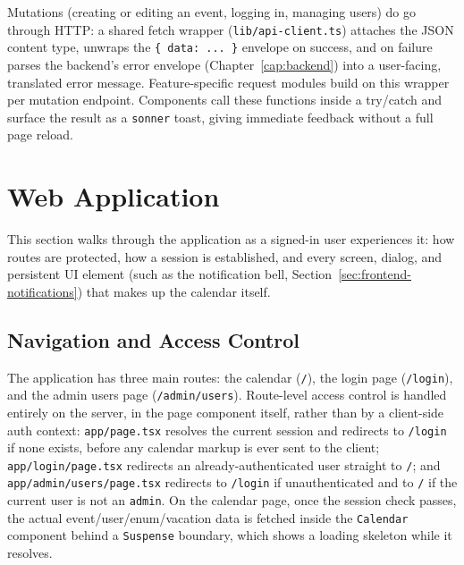 Mutations (creating or editing an event, logging in, managing users) do go through HTTP: a shared fetch wrapper (\texttt{lib/api-client.ts}) attaches the JSON content type, unwraps the \texttt{\{ data: ... \}} envelope on success, and on failure parses the backend's error envelope (Chapter~\ref{cap:backend}) into a user-facing, translated error message. Feature-specific request modules build on this wrapper per mutation endpoint. Components call these functions inside a try/catch and surface the result as a \texttt{sonner} toast, giving immediate feedback without a full page reload.

\section{Web Application} \label{sec:frontend-web-app}

This section walks through the application as a signed-in user experiences it: how routes are protected, how a session is established, and every screen, dialog, and persistent UI element (such as the notification bell, Section~\ref{sec:frontend-notifications}) that makes up the calendar itself.

\subsection{Navigation and Access Control} \label{sec:frontend-navigation}
The application has three main routes: the calendar (\texttt{/}), the login page (\texttt{/login}), and the admin users page (\texttt{/admin/users}). Route-level access control is handled entirely on the server, in the page component itself, rather than by a client-side auth context: \texttt{app/page.tsx} resolves the current session and redirects to \texttt{/login} if none exists, before any calendar markup is ever sent to the client; \texttt{app/login/page.tsx} redirects an already-authenticated user straight to \texttt{/}; and \texttt{app/admin/users/page.tsx} redirects to \texttt{/login} if unauthenticated and to \texttt{/} if the current user is not an \texttt{admin}. On the calendar page, once the session check passes, the actual event/user/enum/vacation data is fetched inside the \texttt{Calendar} component behind a \texttt{Suspense} boundary, which shows a loading skeleton while it resolves.

